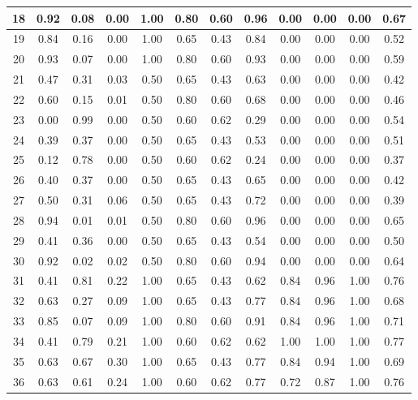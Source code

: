 \documentclass{article}
\begin{document}
\begin{table}[h!]
\begin{tabular}{|c|c|c|c|c|c|c|c|c|c|c|c|}
    \hline
    18 & 0.92 & 0.08 & 0.00 & 1.00 & 0.80 & 0.60 & 0.96 & 0.00 & 0.00 & 0.00 & 0.67 \\
    \hline
    19 & 0.84 & 0.16 & 0.00 & 1.00 & 0.65 & 0.43 & 0.84 & 0.00 & 0.00 & 0.00 & 0.52 \\
    \hline
    20 & 0.93 & 0.07 & 0.00 & 1.00 & 0.80 & 0.60 & 0.93 & 0.00 & 0.00 & 0.00 & 0.59 \\
    \hline
    21 & 0.47 & 0.31 & 0.03 & 0.50 & 0.65 & 0.43 & 0.63 & 0.00 & 0.00 & 0.00 & 0.42 \\
    \hline
    22 & 0.60 & 0.15 & 0.01 & 0.50 & 0.80 & 0.60 & 0.68 & 0.00 & 0.00 & 0.00 & 0.46 \\
    \hline
    23 & 0.00 & 0.99 & 0.00 & 0.50 & 0.60 & 0.62 & 0.29 & 0.00 & 0.00 & 0.00 & 0.54 \\
    \hline
    24 & 0.39 & 0.37 & 0.00 & 0.50 & 0.65 & 0.43 & 0.53 & 0.00 & 0.00 & 0.00 & 0.51 \\
    \hline
    25 & 0.12 & 0.78 & 0.00 & 0.50 & 0.60 & 0.62 & 0.24 & 0.00 & 0.00 & 0.00 & 0.37 \\
    \hline
    26 & 0.40 & 0.37 & 0.00 & 0.50 & 0.65 & 0.43 & 0.65 & 0.00 & 0.00 & 0.00 & 0.42 \\
    \hline
    27 & 0.50 & 0.31 & 0.06 & 0.50 & 0.65 & 0.43 & 0.72 & 0.00 & 0.00 & 0.00 & 0.39 \\
    \hline
    28 & 0.94 & 0.01 & 0.01 & 0.50 & 0.80 & 0.60 & 0.96 & 0.00 & 0.00 & 0.00 & 0.65 \\
    \hline
    29 & 0.41 & 0.36 & 0.00 & 0.50 & 0.65 & 0.43 & 0.54 & 0.00 & 0.00 & 0.00 & 0.50 \\
    \hline
    30 & 0.92 & 0.02 & 0.02 & 0.50 & 0.80 & 0.60 & 0.94 & 0.00 & 0.00 & 0.00 & 0.64 \\
    \hline
    31 & 0.41 & 0.81 & 0.22 & 1.00 & 0.65 & 0.43 & 0.62 & 0.84 & 0.96 & 1.00 & 0.76 \\
    \hline
    32 & 0.63 & 0.27 & 0.09 & 1.00 & 0.65 & 0.43 & 0.77 & 0.84 & 0.96 & 1.00 & 0.68 \\
    \hline
    33 & 0.85 & 0.07 & 0.09 & 1.00 & 0.80 & 0.60 & 0.91 & 0.84 & 0.96 & 1.00 & 0.71 \\
    \hline
    34 & 0.41 & 0.79 & 0.21 & 1.00 & 0.60 & 0.62 & 0.62 & 1.00 & 1.00 & 1.00 & 0.77 \\
    \hline
    35 & 0.63 & 0.67 & 0.30 & 1.00 & 0.65 & 0.43 & 0.77 & 0.84 & 0.94 & 1.00 & 0.69 \\
    \hline
    36 & 0.63 & 0.61 & 0.24 & 1.00 & 0.60 & 0.62 & 0.77 & 0.72 & 0.87 & 1.00 & 0.76 \\

\end{tabular}
\end{table}
\end{document}
